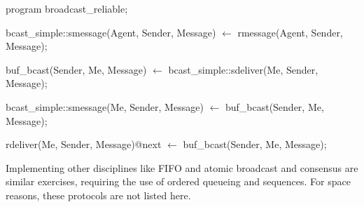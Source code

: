 \begin{Dedalus}
program broadcast_reliable;

bcast_simple::smessage(Agent, Sender, Message)  \(\leftarrow\)
    rmessage(Agent, Sender, Message);

buf_bcast(Sender, Me, Message)  \(\leftarrow\)
    bcast_simple::sdeliver(Me, Sender, Message);

bcast_simple::smessage(Me, Sender, Message)  \(\leftarrow\)
    buf_bcast(Sender, Me, Message);

rdeliver(Me, Sender, Message)@next  \(\leftarrow\)
    buf_bcast(Sender, Me, Message);

\end{Dedalus}

Implementing other disciplines like FIFO and atomic broadcast and consensus are similar exercises, requiring the use of
ordered queueing and sequences.  For space reasons, these protocols are not listed here.